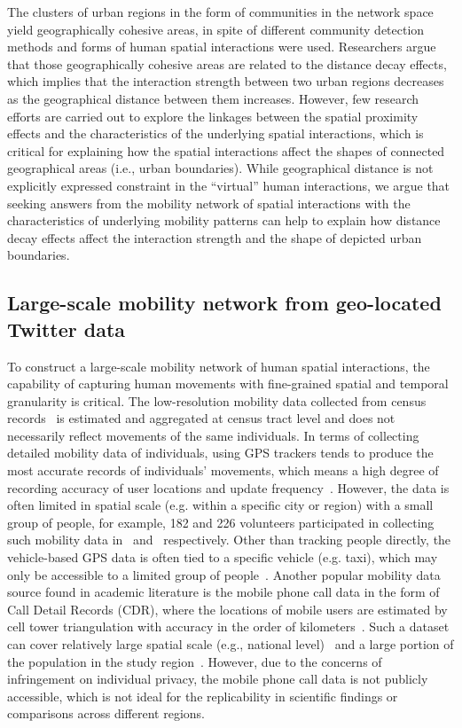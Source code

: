 \documentclass[]{tGIS2e}
\begin{document}
The clusters of urban regions in the form of communities in the network space yield geographically cohesive areas, in spite of different community detection methods and forms of human spatial interactions were used.
Researchers argue that those geographically cohesive areas are related to the distance decay effects, which implies that the interaction strength between two urban regions decreases as the geographical distance between them increases.
However, few research efforts are carried out to explore the linkages between the spatial proximity effects and the characteristics of the underlying spatial interactions, which is critical for explaining how the spatial interactions affect the shapes of connected geographical areas (i.e., urban boundaries).
While geographical distance is not explicitly expressed constraint in the ``virtual'' human interactions, we argue that seeking answers from the mobility network of spatial interactions with the characteristics of underlying mobility patterns can help to explain how distance decay effects affect the interaction strength and the shape of depicted urban boundaries.  

\subsection{Large-scale mobility network from geo-located Twitter data}
To construct a large-scale mobility network of human spatial interactions, the capability of capturing human movements with fine-grained spatial and temporal granularity is critical.
The low-resolution mobility data collected from census records~\citep{rae2009} is estimated and aggregated at census tract level and does not necessarily reflect movements of the same individuals.
In terms of collecting detailed mobility data of individuals, using GPS trackers tends to produce the most accurate records of individuals' movements, which means a high degree of recording accuracy of user locations and update frequency~\citep{zheng2008}.
However, the data is often limited in spatial scale (e.g. within a specific city or region) with a small group of people, for example, 182 and 226 volunteers participated in collecting such mobility data in~\citep{zheng2008} and~\citep{rhee2011} respectively.
Other than tracking people directly, the vehicle-based GPS data is often tied to a specific vehicle (e.g. taxi), which may only be accessible to a limited group of people~\citep{kung2014}. 
Another popular mobility data source found in academic literature is the mobile phone call data in the form of Call Detail Records (CDR), where the locations of mobile users are estimated by cell tower triangulation with accuracy in the order of kilometers~\citep{gonzalez2008,kung2014,zhong2014}. 
Such a dataset can cover relatively large spatial scale (e.g., national level)~\citep{sobolevsky2013} and a large portion of the population in the study region~\citep{kung2014}. 
However, due to the concerns of infringement on individual privacy, the mobile phone call data is not publicly accessible, which is not ideal for the replicability in scientific findings or comparisons across different regions.
\end{document}
